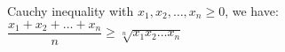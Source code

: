 \documentclass[12pt,a4paper]{article}
\begin{document}
Cauchy inequality with  $x_1,x_2,\ldots,x_n\geq 0$, we have: $\dfrac{x_1+x_2+\ldots+x_n}{n}\geq \sqrt[n]{x_1 x_2\ldots x_n}$
\end{document}

